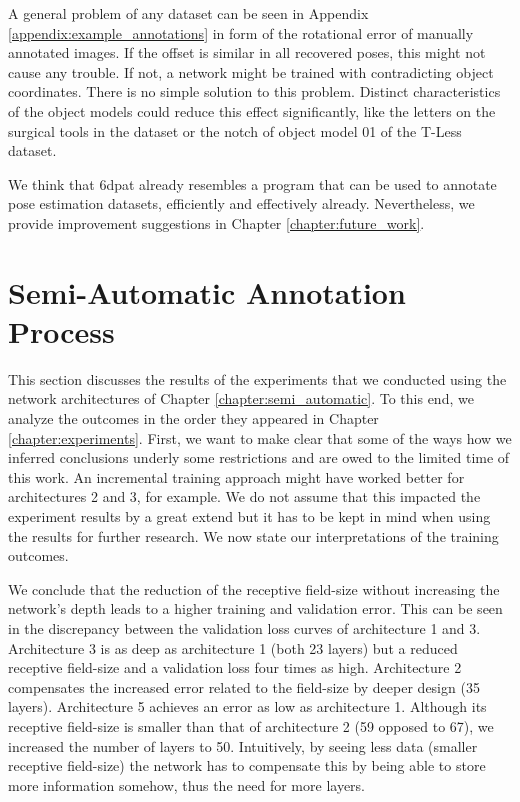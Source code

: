 A general problem of any dataset can be seen in Appendix \ref{appendix:example_annotations} in form of the rotational error of manually annotated images. If the offset is similar in all recovered poses, this might not cause any trouble. If not, a network might be trained with contradicting object coordinates. There is no simple solution to this problem. Distinct characteristics of the object models could reduce this effect significantly, like the letters on the surgical tools in the  dataset or the notch of object model 01 of the T-Less dataset.

We think that \ac{6dpat} already resembles a program that can be used to annotate pose estimation datasets, efficiently and effectively already. Nevertheless, we provide improvement suggestions in Chapter \ref{chapter:future_work}.

\section{Semi-Automatic Annotation Process}

This section discusses the results of the experiments that we conducted using the network architectures of Chapter \ref{chapter:semi_automatic}. To this end, we analyze the outcomes in the order they appeared in Chapter \ref{chapter:experiments}. First, we want to make clear that some of the ways how we inferred conclusions underly some restrictions and are owed to the limited time of this work. An incremental training approach might have worked better for architectures 2 and 3, for example. We do not assume that this impacted the experiment results by a great extend but it has to be kept in mind when using the results for further research. We now state our interpretations of the training outcomes.

We conclude that the reduction of the receptive field-size without increasing the network's depth leads to a higher training and validation error. This can be seen in the discrepancy between the validation loss curves of architecture 1 and 3. Architecture 3 is as deep as architecture 1 (both 23 layers) but a reduced receptive field-size and a validation loss four times as high. Architecture 2 compensates the increased error related to the field-size by deeper design (35 layers). Architecture 5 achieves an error as low as architecture 1. Although its receptive field-size is smaller than that of architecture 2 (59 opposed to 67), we increased the number of layers to 50. Intuitively, by seeing less data (smaller receptive field-size) the network has to compensate this by being able to store more information somehow, thus the need for more layers.

